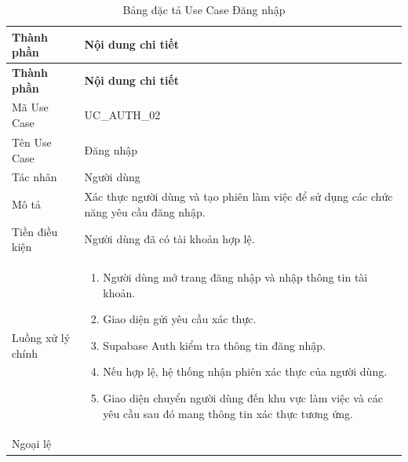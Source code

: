 \documentclass[12pt,a4paper,oneside]{report}
\begin{document}
{
  \begin{longtable}{|L{3.6cm}|L{11.2cm}|}
    \caption{Bảng đặc tả Use Case Đăng nhập}\label{tab:uc-login}                                                                       \\
    \hline
    \textbf{Thành phần} & \textbf{Nội dung chi tiết}                                                                                     \\
    \hline
    \endfirsthead
    \hline
    \textbf{Thành phần} & \textbf{Nội dung chi tiết}                                                                                     \\
    \hline
    \endhead
    Mã Use Case       & UC\_AUTH\_02                                                                                                   \\
    \hline
    Tên Use Case      & Đăng nhập                                                                                                      \\
    \hline
    Tác nhân            & Người dùng                                                                                                     \\
    \hline
    Mô tả               & Xác thực người dùng và tạo phiên làm việc để sử dụng các chức năng yêu cầu đăng nhập.                          \\
    \hline
    Tiền điều kiện      & Người dùng đã có tài khoản hợp lệ.                                                                             \\
    \hline
    Luồng xử lý chính   & \begin{enumerate}[leftmargin=*,nosep]
                            \item Người dùng mở trang đăng nhập và nhập thông tin tài khoản.
                            \item Giao diện gửi yêu cầu xác thực.
                            \item Supabase Auth kiểm tra thông tin đăng nhập.
                            \item Nếu hợp lệ, hệ thống nhận phiên xác thực của người dùng.
                            \item Giao diện chuyển người dùng đến khu vực làm việc và các yêu cầu sau đó mang thông tin xác thực tương ứng.
                          \end{enumerate} \\
    \hline
    Ngoại lệ            & \begin{enumerate}[leftmargin=*,nosep]

\end{enumerate}
\end{longtable}}
\end{document}
